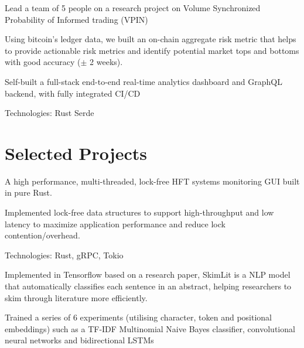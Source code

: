 \documentclass[]{cv}
\begin{document}
\begin{minipage}[t]{0.66\textwidth}
\subtitle{Aug 2022 – Present}
\begin{tightemize}
\item Lead a team of 5 people on a research project on Volume Synchronized Probability of Informed trading (VPIN)
\item Using bitcoin’s ledger data, we built an on-chain aggregate risk metric that helps to provide actionable risk metrics and identify potential market tops and bottoms with good accuracy ($\pm$ 2 weeks).
\item Self-built a full-stack end-to-end real-time analytics dashboard and GraphQL backend, with fully integrated CI/CD
\item Technologies: Rust \textbullet{} Serde \textbullet{} 
\end{tightemize}
\sectionsep

\section{Selected Projects}

\subtitle{\href{https://github.com/g-tejas/enigma/}{Github}}
\begin{tightemize}
    \item A high performance, multi-threaded, lock-free HFT systems monitoring GUI built in pure Rust.
    \item Implemented lock-free data structures to support high-throughput and low latency to maximize application performance and reduce lock contention/overhead.
    \item Technologies: Rust, gRPC, Tokio
\end{tightemize}
\sectionsep



\subtitle{\href{https://github.com/g-tejas/SkimLit/}{Github}}
\begin{tightemize}
    \item Implemented in Tensorflow based on a research paper, SkimLit is a NLP model that automatically classifies each sentence in an abstract, helping researchers to skim through literature more efficiently.
    \item Trained a series of 6 experiments (utilising character, token and positional embeddings) such as a TF-IDF Multinomial Naive Bayes classifier, convolutional neural networks and bidirectional LSTMs
\end{tightemize}
\sectionsep

\end{minipage} 
\end{document}

